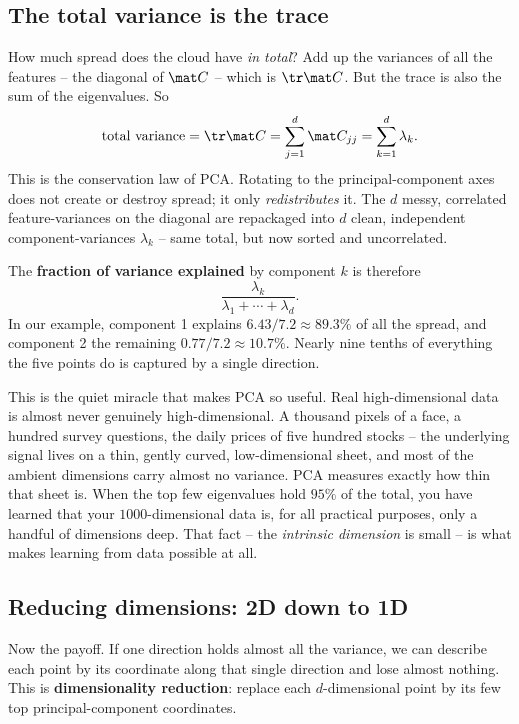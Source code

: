 \subsection{The total variance is the trace}

How much spread does the cloud have \emph{in total}? Add up the variances of all
the features -- the diagonal of $\mat C$ -- which is $\tr\mat C$. But the trace is
also the sum of the eigenvalues. So
\[
  \text{total variance}=\tr\mat C=\sum_{j=1}^d \mat C_{jj}=\sum_{k=1}^d\lambda_k .
\]
This is the conservation law of PCA. Rotating to the principal-component axes does
not create or destroy spread; it only \emph{redistributes} it. The $d$ messy,
correlated feature-variances on the diagonal are repackaged into $d$ clean,
independent component-variances $\lambda_k$ -- same total, but now sorted and
uncorrelated.

The \textbf{fraction of variance explained} by component $k$ is therefore
\[
  \frac{\lambda_k}{\lambda_1+\cdots+\lambda_d} .
\]
In our example, component 1 explains $6.43/7.2\approx 89.3\%$ of all the spread,
and component 2 the remaining $0.77/7.2\approx 10.7\%$. Nearly nine tenths of
everything the five points do is captured by a single direction.

\begin{aestheticbox}
This is the quiet miracle that makes PCA so useful. Real high-dimensional data is
almost never genuinely high-dimensional. A thousand pixels of a face, a hundred
survey questions, the daily prices of five hundred stocks -- the underlying signal
lives on a thin, gently curved, low-dimensional sheet, and most of the ambient
dimensions carry almost no variance. PCA measures exactly how thin that sheet is.
When the top few eigenvalues hold $95\%$ of the total, you have learned that your
$1000$-dimensional data is, for all practical purposes, only a handful of
dimensions deep. That fact -- the \emph{intrinsic dimension} is small -- is what
makes learning from data possible at all.
\end{aestheticbox}

\subsection{Reducing dimensions: 2D down to 1D}

Now the payoff. If one direction holds almost all the variance, we can describe each
point by its coordinate along that single direction and lose almost nothing. This
is \textbf{dimensionality reduction}: replace each $d$-dimensional point by its few
top principal-component coordinates.

